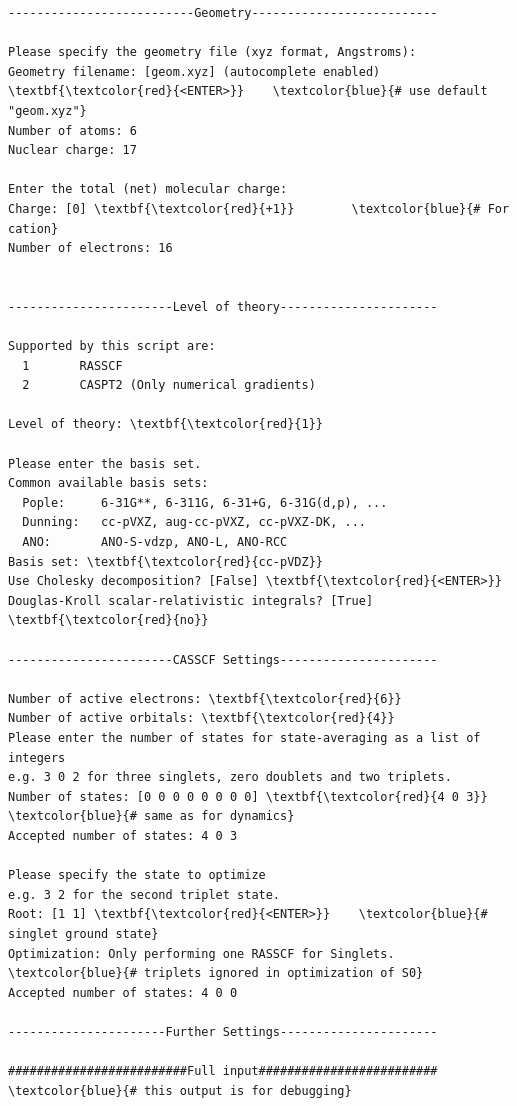 \documentclass[a4paper,11pt,DIV=15,openany]{scrbook}
\begin{document}
\begin{oframed}
\begin{Verbatim}[commandchars=\\\{\}]
--------------------------Geometry--------------------------

Please specify the geometry file (xyz format, Angstroms):
Geometry filename: [geom.xyz] (autocomplete enabled) \textbf{\textcolor{red}{<ENTER>}}    \textcolor{blue}{# use default "geom.xyz"}
Number of atoms: 6
Nuclear charge: 17

Enter the total (net) molecular charge:
Charge: [0] \textbf{\textcolor{red}{+1}}        \textcolor{blue}{# For cation}
Number of electrons: 16


-----------------------Level of theory----------------------

Supported by this script are:
  1       RASSCF
  2       CASPT2 (Only numerical gradients)

Level of theory: \textbf{\textcolor{red}{1}}

Please enter the basis set.
Common available basis sets:
  Pople:     6-31G**, 6-311G, 6-31+G, 6-31G(d,p), ...    
  Dunning:   cc-pVXZ, aug-cc-pVXZ, cc-pVXZ-DK, ...    
  ANO:       ANO-S-vdzp, ANO-L, ANO-RCC                   
Basis set: \textbf{\textcolor{red}{cc-pVDZ}}
Use Cholesky decomposition? [False] \textbf{\textcolor{red}{<ENTER>}}
Douglas-Kroll scalar-relativistic integrals? [True] \textbf{\textcolor{red}{no}}

-----------------------CASSCF Settings----------------------

Number of active electrons: \textbf{\textcolor{red}{6}}
Number of active orbitals: \textbf{\textcolor{red}{4}}
Please enter the number of states for state-averaging as a list of integers
e.g. 3 0 2 for three singlets, zero doublets and two triplets.
Number of states: [0 0 0 0 0 0 0 0] \textbf{\textcolor{red}{4 0 3}}    \textcolor{blue}{# same as for dynamics}
Accepted number of states: 4 0 3

Please specify the state to optimize
e.g. 3 2 for the second triplet state.
Root: [1 1] \textbf{\textcolor{red}{<ENTER>}}    \textcolor{blue}{# singlet ground state}
Optimization: Only performing one RASSCF for Singlets.  \textcolor{blue}{# triplets ignored in optimization of S0}
Accepted number of states: 4 0 0

----------------------Further Settings----------------------

#########################Full input#########################    \textcolor{blue}{# this output is for debugging}


\end{Verbatim}
\end{oframed}
\end{document}
